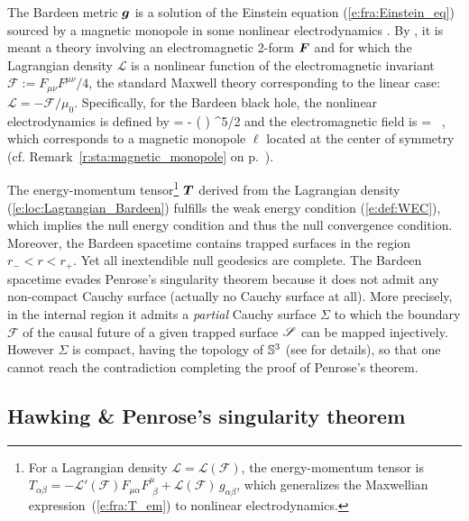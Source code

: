 \begin{example}
The Bardeen metric $\bm{g}$ is a solution of the Einstein equation
(\ref{e:fra:Einstein_eq}) sourced by a magnetic monopole in some nonlinear
electrodynamics \cite{AyonG00}. By ,
it is meant a theory involving an electromagnetic 2-form $\bm{F}$ and for which
the Lagrangian density $\mathcal{L}$ is
a nonlinear function of the electromagnetic invariant $\mathcal{F} := F_{\mu\nu} F^{\mu\nu} / 4$,
the standard Maxwell theory corresponding to the linear case: $\mathcal{L} = - \mathcal{F}/\mu_0$.
Specifically, for the Bardeen black hole, the nonlinear electrodynamics is defined by \cite{AyonG00}
\be \label{e:loc:Lagrangian_Bardeen}
     = -  \left(
     \right) ^{5/2}
\ee
and the electromagnetic field is
\be
     =  \ell \sin\th \, \dd\th \wedge \dd\ph,
\ee
which corresponds to a magnetic monopole $\ell$ located at the center of symmetry
(cf. Remark~\ref{r:sta:magnetic_monopole} on p.~\pageref{r:sta:magnetic_monopole}).

The energy-momentum tensor\footnote{For a Lagrangian density $\mathcal{L} = \mathcal{L}(\mathcal{F})$,
the energy-momentum tensor is
$T_{\alpha\beta} = - \mathcal{L}'(\mathcal{F}) F_{\mu\alpha} F^\mu_{\ \, \beta}
        + \mathcal{L}(\mathcal{F}) \, g_{\alpha\beta}$,
which generalizes the Maxwellian expression~(\ref{e:fra:T_em}) to nonlinear electrodynamics.}
$\bm{T}$ derived from the Lagrangian density (\ref{e:loc:Lagrangian_Bardeen})
fulfills the weak energy condition (\ref{e:def:WEC}), which implies the null energy condition and
thus the null convergence condition.
Moreover, the Bardeen spacetime contains trapped surfaces in the region $r_- < r < r_+$. Yet all inextendible null geodesics are complete. The Bardeen spacetime evades Penrose's singularity theorem
because it does not admit any non-compact Cauchy surface (actually no Cauchy surface at all). More precisely, in the internal region
it admits a \emph{partial} Cauchy surface $\Sigma$ to which the boundary $\mathscr{F}$
of the causal future of a given trapped surface $\mathscr{S}$ can be mapped injectively.
However $\Sigma$ is compact,
having the topology of $\mathbb{S}^3$ (see \cite{Borde97} for details), so that one cannot reach
the contradiction completing the proof of Penrose's theorem.
\end{example}


\subsection{Hawking \& Penrose's singularity theorem}

